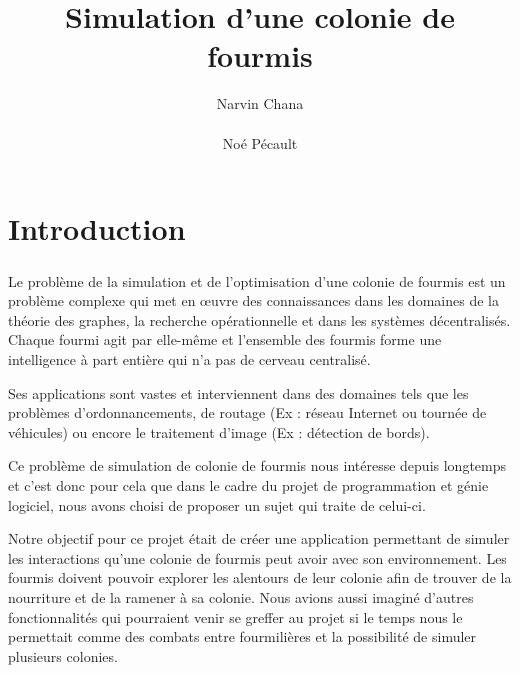 \documentclass{EPUProjetDi}
\title[Simulation d'une colonie de fourmis]{Simulation d'une colonie de fourmis}
\author{
Narvin Chana\\ %
\noindent[\url{narvin.chana@etu.univ-tours.fr}]\\
Noé Pécault\\ %
\noindent[\url{noe.pecault@etu.univ-tours.fr}]}
\begin{document}
\maketitle

\setcounter{page}{0}

{
\setlength{\parskip}{0em}

\tableofcontents


}


\start

\chapter*{Introduction}

\paragraph{}
Le problème de la simulation et de l'optimisation d'une colonie de fourmis est un problème complexe 
qui met en \oe{}uvre des connaissances dans les domaines de la théorie des graphes, la recherche opérationnelle 
et dans les systèmes décentralisés. Chaque fourmi agit par elle-même et l'ensemble des fourmis forme une intelligence
à part entière qui n'a pas de cerveau centralisé.

Ses applications sont vastes et interviennent dans des domaines tels que les problèmes d'ordonnancements, 
de routage (Ex : réseau Internet ou tournée de véhicules) ou encore le traitement d'image (Ex : détection de bords).

Ce problème de simulation de colonie de fourmis nous intéresse depuis longtemps et c'est donc pour cela que dans 
le cadre du projet de programmation et génie logiciel, nous avons choisi de proposer un sujet qui traite de celui-ci.

Notre objectif pour ce projet était de créer une application permettant de simuler les interactions qu'une colonie 
de fourmis peut avoir avec son environnement. Les fourmis doivent pouvoir explorer les alentours de leur colonie afin 
de trouver de la nourriture et de la ramener à sa colonie. 
Nous avions aussi imaginé d'autres fonctionnalités qui pourraient venir se greffer au projet si le temps nous le permettait
comme des combats entre fourmilières et la possibilité de simuler plusieurs colonies.
\end{document}
